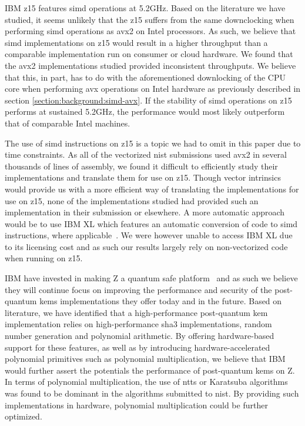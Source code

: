 IBM \gls{z15} features \gls{simd} operations at 5.2GHz. Based on the literature we have studied, it seems unlikely that the \gls{z15} suffers from the same downclocking when performing \gls{simd} operations as \gls{avx2} on Intel processors. As such, we believe that \gls{simd} implementations on \gls{z15} would result in a higher throughput than a comparable implementation run on consumer or cloud hardware. We found that the \gls{avx2} implementations studied provided inconsistent throughputs. We believe that this, in part, has to do with the aforementioned downlocking of the CPU core when performing \gls{avx} operations on Intel hardware as previously described in section \ref{section:background:simd-avx}. If the stability of \gls{simd} operations on \gls{z15} performs at sustained 5.2GHz, the performance would most likely outperform that of comparable Intel machines.

The use of \gls{simd} instructions on \gls{z15} is a topic we had to omit in this paper due to time constraints. As all of the vectorized \gls{nist} submissions used \gls{avx2} in several thousands of lines of assembly, we found it difficult to efficiently study their implementations and translate them for use on \gls{z15}. Though vector intrinsics would provide us with a more efficient way of translating the implementations for use on \gls{z15}, none of the implementations studied had provided such an implementation in their submission or elsewhere. A more automatic approach would be to use IBM XL which features an automatic conversion of code to \gls{simd} instructions, where applicable~\cite{ibm:xl-autosimd}. We were however unable to access IBM XL due to its licensing cost and as such our results largely rely on non-vectorized code when running on \gls{z15}.

IBM have invested in making Z a quantum safe platform~\cite{ibm:z15:2019} and as such we believe they will continue focus on improving the performance and security of the \gls{post-quantum} \glspl{kem} implementations they offer today and in the future. Based on literature, we have identified that a high-performance \gls{post-quantum} \gls{kem} implementation relies on high-performance \gls{sha3} implementations, random number generation and polynomial arithmetic. By offering hardware-based support for these features, as well as by introducing hardware-accelerated polynomial primitives such as polynomial multiplication, we believe that IBM would further assert the potentials the performance of \gls{post-quantum} \glspl{kem} on Z. In terms of polynomial multiplication, the use of \glspl{ntt} or Karatsuba algorithms was found to be dominant in the algorithms submitted to \gls{nist}. By providing such implementations in hardware, polynomial multiplication could be further optimized.

